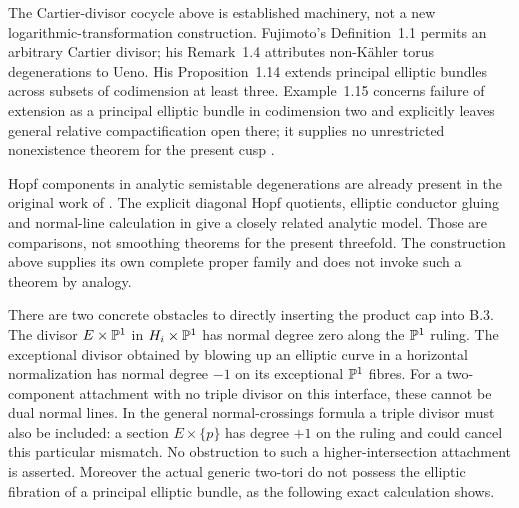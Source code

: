 \begin{remark}
The Cartier-divisor cocycle above is established machinery, not
a new logarithmic-transformation construction.  Fujimoto's
Definition~1.1 permits an arbitrary Cartier divisor; his
Remark~1.4 attributes non-K\"ahler torus degenerations to Ueno.
His Proposition~1.14 extends principal elliptic bundles across
subsets of codimension at least three.  Example~1.15 concerns
failure of extension as a principal elliptic bundle in
codimension two and explicitly leaves general relative
compactification open there; it supplies no unrestricted
nonexistence theorem for the present cusp
\citep[pp.~85--86, 93--94]{Fujimoto1990AB}.

Hopf components in analytic semistable degenerations are already
present in the original work of
\citet[Theorem 1.4 and Sections 2--3]{Nishiguchi1988IIRoot}.
The explicit diagonal Hopf quotients, elliptic conductor gluing
and normal-line calculation in
\citet[Section 3, especially Propositions 3.1--3.4]{SS00}
give a closely related analytic model.  Those are comparisons,
not smoothing theorems for the present threefold.  The construction
above supplies its own complete proper family and does not invoke
such a theorem by analogy.

There are two concrete obstacles to directly inserting the product
cap into B.3.  The divisor $E\times\mathbb P^1$ in
$H_i\times\mathbb P^1$ has normal degree zero along the $\mathbb P^1$
ruling.  The exceptional divisor obtained by blowing up an
elliptic curve in a horizontal normalization has normal degree
$-1$ on its exceptional $\mathbb P^1$ fibres.  For a two-component
attachment with no triple divisor on this interface, these cannot
be dual normal lines.  In the general normal-crossings formula
a triple divisor must also be included: a section
$E\times\{p\}$ has degree $+1$ on the ruling and could cancel
this particular mismatch.  No obstruction to such a higher-intersection
attachment is asserted.  Moreover the actual generic two-tori
do not possess the elliptic fibration of a principal elliptic
bundle, as the following exact calculation shows.


\end{remark}
